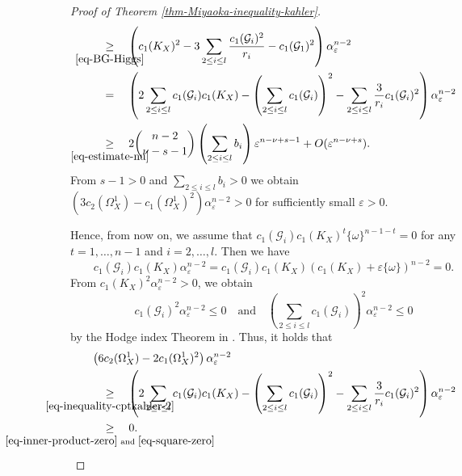 \documentclass[12pt]{amsart}
\theoremstyle{definition}
\theoremstyle{remark}
\numberwithin{equation}{section}
\newcommand{\underalign}[2]{\quad \underset{\mathclap{\strut #1}}{#2}\quad}
\begin{document}
\begin{proof}[Proof of Theorem \ref{thm-Miyaoka-inequality-kahler}]
\begin{align}
\begin{split}
&\underalign{\eqref{eq-BG-Higgs}}{\ge}
\left(
c_1(K_X)^2
- 3\sum_{2\le i\le l}\frac{c_1(\mathcal{G}_i)^2}{r_i}  
 -  c_{1}(\mathcal{G}_1)^{2}
 \right) 
 \alpha_{ \varepsilon }^{n-2}  \\
 &\underalign{}{=}  
 \left(
 2 \sum_{2\le i\le l} c_1(\mathcal{G}_i)c_1(K_X) 
 - \left( \sum_{2\le i\le l} c_1(\mathcal{G}_i) \right)^2
 - \sum_{2\le i\le l} \frac{3}{r_i}c_1(\mathcal{G}_i)^2
 \right)
 \alpha_{ \varepsilon }^{n-2}
 \\
 &\underalign{ \eqref{eq-estimate-nu}}{\ge} 
 2\binom{n-2}{\nu-s-1} \left(\sum_{2 \le i\le l}b_{i}\right)  \varepsilon ^{n-\nu+s-1}+ O( \varepsilon ^{n-\nu+s}).
 \end{split}
\end{align}
From $s-1>0$ and  $\sum_{2 \le i\le l}b_{i}>0$
we obtain $\left(3c_2(\Omega_{X}^{1}) -  c_1(\Omega_{X}^{1})^2 \right)\alpha_{ \varepsilon }^{n-2} >0$
for sufficiently small $ \varepsilon >0$.

Hence, from now on, we assume that $c_1(\mathcal{G}_i)c_1(K_X)^{t}\{\omega\}^{n-1-t} = 0 $
for any $t = 1, \dots,  n-1$ and $i = 2, \dots, l$.
Then we have
\begin{equation}
\label{eq-inner-product-zero}
c_1(\mathcal{G}_i)c_1(K_X)\alpha_{ \varepsilon } ^{n-2}=c_1(\mathcal{G}_i)c_1(K_X)(c_1(K_X) +  \varepsilon  \{\omega\})^{n-2}=0.
\end{equation}
From $c_1(K_X)^2\alpha_{ \varepsilon } ^{n-2} >0$,
we obtain 
\begin{equation}
\label{eq-square-zero}
c_1(\mathcal{G}_i)^2 \alpha_{ \varepsilon } ^{n-2} \le 0 \quad \text{and} \quad 
\left( \sum_{2\le i\le l} c_1(\mathcal{G}_i) \right)^2 \alpha_{ \varepsilon } ^{n-2}\le 0
\end{equation}
by the Hodge index Theorem in \cite[Lemma 6.1]{IM22}.
Thus, it holds that
\begin{align*}
\begin{split}
&\left(6c_2(\Omega_{X}^{1}) - 2 c_1(\Omega_{X}^{1})^2 \right)\alpha_{ \varepsilon }^{n-2} \\
&\underalign{\eqref{eq-inequality-cptkahler-2}}{\ge}
 \left(
 2 \sum_{2\le i\le l} c_1(\mathcal{G}_i)c_1(K_X) 
 - \left( \sum_{2\le i\le l} c_1(\mathcal{G}_i) \right)^2
 - \sum_{2\le i\le l} \frac{3}{r_i}c_1(\mathcal{G}_i)^2
 \right)
 \alpha_{ \varepsilon }^{n-2} \\
 &\underalign{\eqref{eq-inner-product-zero} \text{ and } \eqref{eq-square-zero}}{\ge}
 0.
 \end{split}
\end{align*}


\end{proof}
\end{document}
